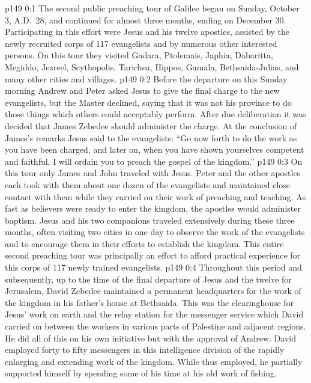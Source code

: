 \author{Midwayer Commission}
\vs p149 0:1 The second public preaching tour of Galilee began on Sunday, October 3, A.D.~28, and continued for almost three months, ending on December 30. Participating in this effort were Jesus and his twelve apostles, assisted by the newly recruited corps of 117 evangelists and by numerous other interested persons. On this tour they visited Gadara, Ptolemais, Japhia, Dabaritta, Megiddo, Jezreel, Scythopolis, Tarichea, Hippos, Gamala, Bethsaida\hyp{}Julias, and many other cities and villages.
\vs p149 0:2 Before the departure on this Sunday morning Andrew and Peter asked Jesus to give the final charge to the new evangelists, but the Master declined, saying that it was not his province to do those things which others could acceptably perform. After due deliberation it was decided that James Zebedee should administer the charge. At the conclusion of James’s remarks Jesus said to the evangelists: \textcolor{ubdarkred}{“Go now forth to do the work as you have been charged, and later on, when you have shown yourselves competent and faithful, I will ordain you to preach the gospel of the kingdom.”}
\vs p149 0:3 On this tour only James and John traveled with Jesus. Peter and the other apostles each took with them about one dozen of the evangelists and maintained close contact with them while they carried on their work of preaching and teaching. As fast as believers were ready to enter the kingdom, the apostles would administer baptism. Jesus and his two companions traveled extensively during these three months, often visiting two cities in one day to observe the work of the evangelists and to encourage them in their efforts to establish the kingdom. This entire second preaching tour was principally an effort to afford practical experience for this corps of 117 newly trained evangelists.
\pc \vs p149 0:4 Throughout this period and subsequently, up to the time of the final departure of Jesus and the twelve for Jerusalem, David Zebedee maintained a permanent headquarters for the work of the kingdom in his father’s house at Bethsaida. This was the clearinghouse for Jesus’ work on earth and the relay station for the messenger service which David carried on between the workers in various parts of Palestine and adjacent regions. He did all of this on his own initiative but with the approval of Andrew. David employed forty to fifty messengers in this intelligence division of the rapidly enlarging and extending work of the kingdom. While thus employed, he partially supported himself by spending some of his time at his old work of fishing.
